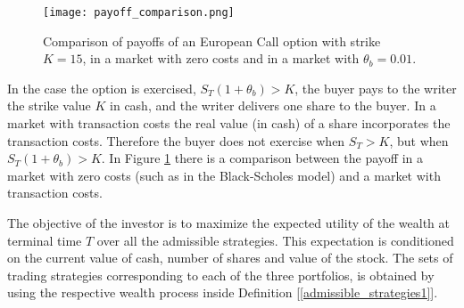 \begin{figure}[t!]
 \centering
 \texttt{[image: payoff\_comparison.png]}
 \caption{Comparison of payoffs of an European Call option with strike $K=15$, in a market with zero costs and in a market with $\theta_b=0.01$.}
 \label{fig:payoff_comparison}
\end{figure}
In the case the option is exercised, $S_T(1+ \theta_b ) > K$, the buyer pays to the writer the strike value $K$ in cash, 
and the writer delivers one share to the buyer.
In a market with transaction costs the real value (in cash) of a share incorporates the transaction costs. 
Therefore the buyer does not exercise when $S_T > K$, but when $S_T(1+ \theta_b ) > K$. 
In Figure \ref{fig:payoff_comparison} there is a comparison between the payoff in a market with zero costs (such as in the Black-Scholes model) and a market with 
transaction costs.

The objective of the investor is to maximize the expected utility of the wealth at terminal time $T$ over all the admissible
strategies. This expectation is conditioned on the current value of cash, number of shares and value of the
stock.
The sets of trading strategies corresponding to each of the three portfolios, is obtained by using the respective wealth process inside Definition [\ref{admissible_strategies1}]. 

